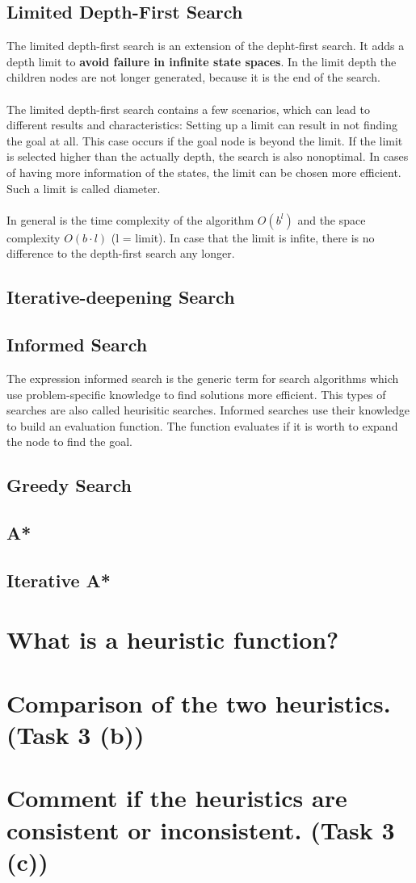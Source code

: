 \documentclass[11pt]{article}
\begin{document}
\subsection{Limited Depth-First Search}
The limited depth-first search is an extension of the depht-first search. It adds a depth limit to \textbf{avoid failure in infinite state spaces}. In the limit depth the children nodes are not longer generated, because it is the end of the search. \\
\\
The limited depth-first search contains a few scenarios, which can lead to different results and characteristics: Setting up a limit can result in not finding the goal at all. This case occurs if the goal node is beyond the limit. If the limit is selected higher than the actually depth, the search is also nonoptimal. In cases of having more information of the states, the limit can be chosen more efficient. Such a limit is called diameter.\\
\\
In general is the time complexity of the algorithm  $O(b^{l})$ and the space complexity $O(b \cdot l)$ (l = limit). In case that the limit is infite, there is no difference to the depth-first search any longer.  

\subsection{Iterative-deepening Search}

\subsection{Informed Search}
The expression informed search is the generic term for search algorithms which use problem-specific knowledge to find solutions more efficient. This types of searches are also called heurisitic searches. Informed searches use their knowledge to build an evaluation function. The function evaluates if it is worth to expand the node to find the goal.

\subsection{Greedy Search}

\subsection{A*}

\subsection{Iterative A*}

\newpage
\section{What is a heuristic function?}

\newpage
\section{Comparison of the two heuristics. (Task 3 (b))}

\newpage
\section{Comment if the heuristics are consistent or inconsistent. (Task 3 (c))}
\end{document}
